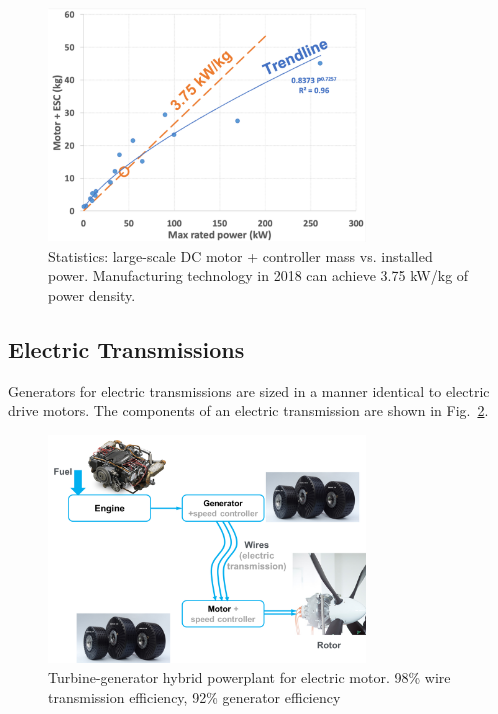 \begin{figure}
\begin{center}
\includegraphics[width=0.75\textwidth]{images/dcmotor.png}
\vspace{-0.1cm}
\caption{Statistics: large-scale DC motor + controller mass vs. installed power. Manufacturing technology in 2018 can achieve 3.75 kW/kg of power density.}
\label{fig:dcmotor}
\end{center}
\end{figure}



\subsection{Electric Transmissions}
Generators for electric transmissions are sized in a manner identical to electric drive motors. The components of an electric transmission are shown in Fig.~\ref{fig:eltrans}.

\begin{figure}
\begin{center}
\includegraphics[width=0.75\textwidth]{images/eltrans.png}
\vspace{-0.1cm}
\caption{Turbine-generator hybrid powerplant for electric motor. 98\% wire transmission efficiency, 92\% generator efficiency}
\label{fig:eltrans}
\end{center}
\end{figure}

